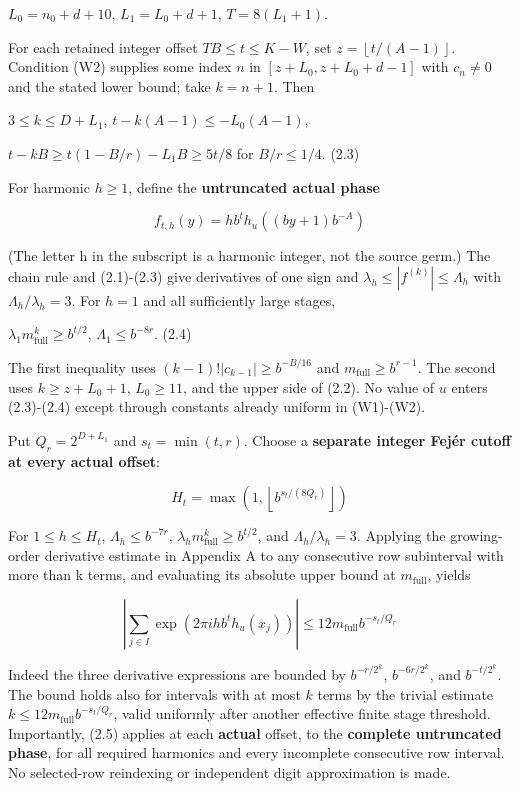 \documentclass[11pt,a4paper]{article}
\begin{document}
\(L_0=n_0+d+10\), \(L_1=L_0+d+1\), \(T=8(L_1+1)\).

For each retained integer offset \(TB\le t\le K-W\), set
\(z=\left\lfloor t/(A-1)\right\rfloor\). Condition (W2) supplies some
index \(n\) in \([z+L_0,z+L_0+d-1]\) with \(c_n \ne  0\) and the stated
lower bound; take \(k=n+1\). Then

\(3\le k\le D+L_1\), \(t-k(A-1)\le -L_0(A-1)\),

\(t-kB \ge  t(1-B/r)-L_1 B \ge  5t/8\) for \(B/r\le 1/4\). (2.3)

For harmonic \(h\ge 1\), define the \textbf{untruncated actual phase}

\[
f_{t,h}(y)=h b^t h_u((by+1)b^{-A})
\]

(The letter h in the subscript is a harmonic integer, not the source
germ.) The chain rule and (2.1)-(2.3) give derivatives of one sign and
\(\lambda_h \le  |f^{(k)}| \le  \Lambda_h\) with
\(\Lambda_h/\lambda_h=3\). For \(h=1\) and all sufficiently large
stages,

\(\lambda_1 m_{\mathrm{full}}^k \ge  b^{t/2}\),
\(\Lambda_1 \le  b^{-8r}\). (2.4)

The first inequality uses \((k-1)!|c_{k-1}| \ge  b^{-B/16}\) and
\(m_{\mathrm{full}}\ge b^{r-1}\). The second uses \(k\ge z+L_0+1\),
\(L_0\ge 11\), and the upper side of (2.2). No value of \(u\) enters
(2.3)-(2.4) except through constants already uniform in (W1)-(W2).

Put \(Q_r=2^{D+L_1}\) and \(s_t=\min(t,r)\). Choose a \textbf{separate
integer Fejér cutoff at every actual offset}:

\[
H_t=\max(1,\left\lfloor b^{s_t/(8 Q_r)}\right\rfloor)
\]

For \(1\le h\le H_t\), \(\Lambda_h\le b^{-7r}\),
\(\lambda_h m_{\mathrm{full}}^k\ge b^{t/2}\), and
\(\Lambda_h/\lambda_h=3\). Applying the growing-order derivative
estimate in Appendix A to any consecutive row subinterval with more than
k terms, and evaluating its absolute upper bound at
\(m_{\mathrm{full}}\), yields

\[
|\sum_{j \in I} \exp(2 \pi i h b^t h_u(x_j))| \le  12 m_{\mathrm{full}} b^{-s_t/Q_r} \tag{2.5}
\]

Indeed the three derivative expressions are bounded by \(b^{-r/2^k}\),
\(b^{-6r/2^k}\), and \(b^{-t/2^k}\). The bound holds also for intervals
with at most \(k\) terms by the trivial estimate
\(k\le 12 m_{\mathrm{full}} b^{-s_t/Q_r}\), valid uniformly after
another effective finite stage threshold. Importantly, (2.5) applies at
each \textbf{actual} offset, to the \textbf{complete untruncated phase},
for all required harmonics and every incomplete consecutive row
interval. No selected-row reindexing or independent digit approximation
is made.
\end{document}
